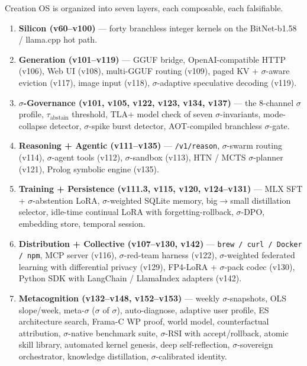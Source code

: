 \documentclass[11pt,letterpaper]{article}
\newcommand{\tabstain}{\tau_{\mathrm{abstain}}}
\newcommand{\code}[1]{\texttt{#1}}
\begin{document}
Creation OS is organized into seven layers, each composable, each
falsifiable.

\begin{enumerate}[leftmargin=*,itemsep=2pt]
  \item \textbf{Silicon (v60--v100)} --- forty branchless integer
    kernels on the BitNet-b1.58 / llama.cpp hot path.
  \item \textbf{Generation (v101--v119)} --- GGUF bridge,
    OpenAI-compatible HTTP (v106), Web UI (v108), multi-GGUF
    routing (v109), paged KV + $\sigma$-aware eviction (v117),
    image input (v118), $\sigma$-adaptive speculative decoding
    (v119).
  \item \textbf{$\sigma$-Governance (v101, v105, v122, v123, v134,
    v137)} --- the 8-channel $\sigma$ profile, $\tabstain$
    threshold, TLA+ model check of seven $\sigma$-invariants,
    mode-collapse detector, $\sigma$-spike burst detector,
    AOT-compiled branchless $\sigma$-gate.
  \item \textbf{Reasoning + Agentic (v111--v135)} ---
    \code{/v1/reason}, $\sigma$-swarm routing (v114),
    $\sigma$-agent tools (v112), $\sigma$-sandbox (v113),
    HTN / MCTS $\sigma$-planner (v121), Prolog symbolic engine
    (v135).
  \item \textbf{Training + Persistence (v111.3, v115, v120,
    v124--v131)} --- MLX SFT + $\sigma$-abstention LoRA,
    $\sigma$-weighted SQLite memory, big$\to$small distillation
    selector, idle-time continual LoRA with forgetting-rollback,
    $\sigma$-DPO, embedding store, temporal session.
  \item \textbf{Distribution + Collective (v107--v130, v142)} ---
    \code{brew / curl / Docker / npm}, MCP server (v116),
    $\sigma$-red-team harness (v122), $\sigma$-weighted federated
    learning with differential privacy (v129), FP4-LoRA +
    $\sigma$-pack codec (v130), Python SDK with LangChain /
    LlamaIndex adapters (v142).
  \item \textbf{Metacognition (v132--v148, v152--v153)} --- weekly
    $\sigma$-snapshots, OLS slope/week, meta-$\sigma$ ($\sigma$
    of $\sigma$), auto-diagnose, adaptive user profile, ES
    architecture search, Frama-C WP proof, world model,
    counterfactual attribution, $\sigma$-native benchmark suite,
    $\sigma$-RSI with accept/rollback, atomic skill library,
    automated kernel genesis, deep self-reflection,
    $\sigma$-sovereign orchestrator, knowledge distillation,
    $\sigma$-calibrated identity.
\end{enumerate}
\end{document}
